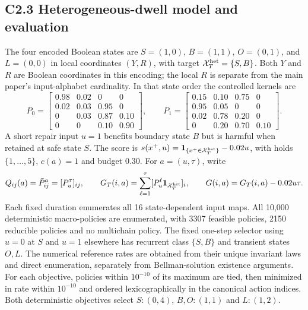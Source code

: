 \documentclass[11pt]{article}
\newcommand{\1}{\mathbf{1}}
\begin{document}
\subsection*{C2.3 Heterogeneous-dwell model and evaluation}
\label{comp:sec:heterogeneous}
The four encoded Boolean states are $S=(1,0)$, $B=(1,1)$, $O=(0,1)$, and $L=(0,0)$ in local coordinates $(Y,R)$, with target $\mathcal X_T^{\rm het}=\{S,B\}$. Both $Y$ and $R$ are Boolean coordinates in this encoding; the local $R$ is separate from the main paper's input-alphabet cardinality. In that state order the controlled kernels are
\[
P_0=\begin{bmatrix}
0.98&0.02&0&0\\
0.02&0.03&0.95&0\\
0&0.03&0.87&0.10\\
0&0&0.10&0.90
\end{bmatrix},\qquad
P_1=\begin{bmatrix}
0.15&0.10&0.75&0\\
0.95&0.05&0&0\\
0.02&0.78&0.20&0\\
0&0.20&0.70&0.10
\end{bmatrix}.
\]
A short repair input $u=1$ benefits boundary state $B$ but is harmful when retained at safe state $S$. The score is $s(x^+,u)=\1_{\{x^+\in\mathcal X_T^{\rm het}\}}-0.02u$, with holds $\{1,\ldots,5\}$, $c(a)=1$ and budget $0.30$. For $a=(u,\tau)$, write
\[
 Q_{ij}(a)=\bar P^a_{ij}=[P_u^\tau]_{ij},\qquad
 G_T(i,a)=\sum_{\ell=1}^{\tau}[P_u^\ell\1_{\mathcal X_T^{\rm het}}]_i,
 \qquad G(i,a)=G_T(i,a)-0.02u\tau.
\]
Each fixed duration enumerates all 16 state-dependent input maps. All 10,000 deterministic macro-policies are enumerated, with 3307 feasible policies, 2150 reducible policies and no multichain policy. The fixed one-step selector using $u=0$ at $S$ and $u=1$ elsewhere has recurrent class $\{S,B\}$ and transient states $O,L$. The numerical reference rates are obtained from their unique invariant laws and direct enumeration, separately from Bellman-solution existence arguments. For each objective, policies within $10^{-10}$ of its maximum are tied, then minimized in rate within $10^{-10}$ and ordered lexicographically in the canonical action indices. Both deterministic objectives select $S:(0,4)$, $B,O:(1,1)$ and $L:(1,2)$.
\end{document}
